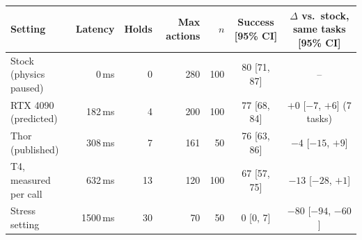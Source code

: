 \begin{tabular}{lrrrrcc}
\toprule
Setting & Latency & Holds & Max actions & $n$ & Success [95\% CI] & $\Delta$ vs.\ stock, same tasks [95\% CI] \\
\midrule
Stock (physics paused) & 0\,ms & 0 & 280 & 100 & 80 [71, 87] & -- \\
RTX 4090 (predicted) & 182\,ms & 4 & 200 & 100 & 77 [68, 84] & $+0$ [$-7$, $+6$] (7 tasks) \\
Thor (published) & 308\,ms & 7 & 161 & 50 & 76 [63, 86] & $-4$ [$-15$, $+9$] \\
T4, measured per call & 632\,ms & 13 & 120 & 100 & 67 [57, 75] & $-13$ [$-28$, $+1$] \\
Stress setting & 1500\,ms & 30 & 70 & 50 & 0 [0, 7] & $-80$ [$-94$, $-60$] \\
\bottomrule
\end{tabular}
